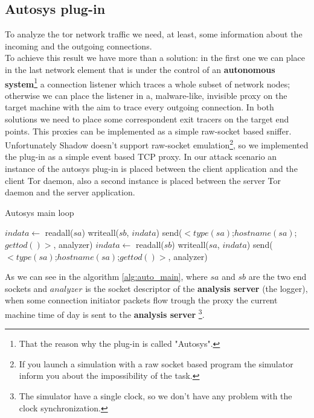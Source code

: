 \subsection{Autosys plug-in}
To analyze the tor network traffic we need, at least, some information about
the incoming and the outgoing connections.\\
To achieve this result we have more than a solution: in the first one we can place 
in the last network element that is under the control of an \textbf{autonomous system}\footnote{
That the reason why the plug-in is called "Autosys".} a connection
listener which traces a whole subset of
network nodes;
otherwise we can place the listener in a, malware-like, invisible proxy on the target
machine with the aim to trace every outgoing connection. 
In both solutions we need to place some correspondent exit tracers on
the target end points.
This proxies can be implemented as a simple raw-socket based sniffer. 
Unfortunately Shadow doesn't support raw-socket
emulation\footnote{If you launch a simulation with a raw socket based program the simulator
inform you about the impossibility of the task.},
so we implemented the plug-in as a simple event based TCP
proxy. In our attack scenario an instance of the autosys plug-in is placed 
between the client application and the client Tor daemon, also a second
 instance is placed between the server Tor daemon and the server application.
\\
\begin{algorithm}
\caption{Autosys main loop}
\begin{algorithmic}[1]
			\State $indata \gets $ readall($sa$)
			\State writeall($sb$, $indata$)
				\State send($<type(sa)$;$hostname(sa)$;$gettod()>$, analyzer)
			\EndIf
		\EndIf
			\State $indata \gets $ readall($sb$)
			\State writeall($sa$, $indata$)
				\State send($<type(sa)$;$hostname(sa)$;$gettod()>$, analyzer)
			\EndIf
		\EndIf
	\EndWhile
\EndFunction
\end{algorithmic}
\label{alg:auto_main}
\end{algorithm}

As we can see in the algorithm \ref{alg:auto_main}, where $sa$ and $sb$ are the two end sockets and
$analyzer$ is the socket descriptor of the \textbf{analysis server} (the logger), when some connection
initiator packets flow trough the proxy the
current machine time of day is sent to the \textbf{analysis server}
\footnote{The simulator have a single clock, so we don't have any problem with the
clock synchronization.}.

